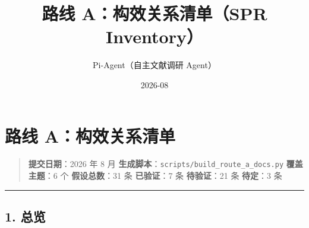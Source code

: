 \documentclass[12pt,a4paper]{ctexart}
\title{ 路线 A：构效关系清单（SPR Inventory） }
\date{ 2026-08 }
\author{Pi-Agent（自主文献调研 Agent）}
\begin{document}
\maketitle
\sloppy  %

\section{路线 A：构效关系清单}\label{ux8defux7ebf-aux6784ux6548ux5173ux7cfbux6e05ux5355}

\begin{quote}
\textbf{提交日期}：2026 年 8 月 \textbf{生成脚本}：\texttt{scripts/build\_route\_a\_docs.py} \textbf{覆盖主题}：6 个 \textbf{假设总数}：31 条 \textbf{已验证}：7 条 \textbar{} \textbf{待验证}：21 条 \textbar{} \textbf{待定}：3 条
\end{quote}

\begin{center}\rule{0.5\linewidth}{0.5pt}\end{center}

\subsection{1. 总览}\label{ux603bux89c8}
\end{document}
